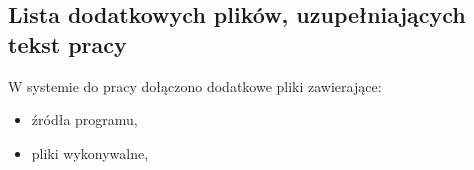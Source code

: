 \documentclass[a4paper,twoside,12pt]{book}
\begin{document}
\begin{appendices}
\chapter{Lista dodatkowych plików, uzupełniających tekst pracy} 


W systemie do pracy dołączono dodatkowe pliki zawierające:
\begin{itemize}
\item źródła programu,
\item pliki wykonywalne,
\end{itemize}


\listoffigures
{}
\listoftables
{}

\end{appendices}
\end{document}
